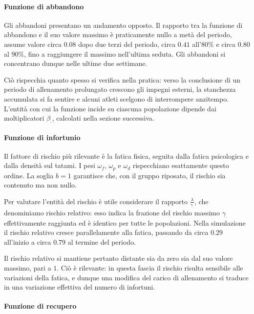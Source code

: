 \paragraph{Funzione di abbandono}

Gli abbandoni presentano un andamento opposto. Il rapporto tra la funzione di abbandono e il suo valore massimo è praticamente nullo a metà del periodo, assume valore circa $0.08$ dopo due terzi del periodo, circa $0.41$ all'$80\%$ e circa $0.80$ al $90\%$, fino a raggiungere il massimo nell'ultima seduta. Gli abbandoni si concentrano dunque nelle ultime due settimane. \par

Ciò rispecchia quanto spesso si verifica nella pratica: verso la conclusione di un periodo di allenamento prolungato crescono gli impegni esterni, la stanchezza accumulata si fa sentire e alcuni atleti scelgono di interrompere anzitempo. L'entità con cui la funzione incide su ciascuna popolazione dipende dai moltiplicatori $\beta_\cdot$, calcolati nella sezione successiva.

\paragraph{Funzione di infortunio}

Il fattore di rischio più rilevante è la fatica fisica, seguita dalla fatica psicologica e dalla densità sul tatami. I pesi $\omega_f$, $\omega_p$ e $\omega_d$ rispecchiano esattamente questo ordine. La soglia $b = 1$ garantisce che, con il gruppo riposato, il rischio sia contenuto ma non nullo. \par

Per valutare l'entità del rischio è utile considerare il rapporto $\frac{\lambda}{\gamma_\cdot}$, che denominiamo rischio relativo: esso indica la frazione del rischio massimo $\gamma_\cdot$ effettivamente raggiunta ed è identico per tutte le popolazioni. Nella simulazione il rischio relativo cresce parallelamente alla fatica, passando da circa $0.29$ all'inizio a circa $0.79$ al termine del periodo. \par

Il rischio relativo si mantiene pertanto distante sia da zero sia dal suo valore massimo, pari a $1$. Ciò è rilevante: in questa fascia il rischio risulta sensibile alle variazioni della fatica, e dunque una modifica del carico di allenamento si traduce in una variazione effettiva del numero di infortuni.

\paragraph{Funzione di recupero}

